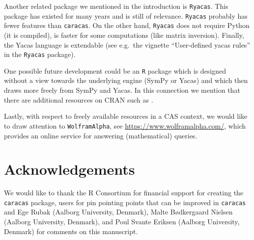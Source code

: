 Another related package we mentioned in the introduction is \texttt{Ryacas}.
This package has existed for many years and is still of relevance.
\texttt{Ryacas} probably has fewer features than \texttt{caracas}. On the other
hand, \texttt{Ryacas} does not require Python (it is compiled), is faster for
some computations (like matrix inversion). Finally, the Yacas language
\citep{Pinkus2002, yacas} is extendable (see e.g.~the vignette
``User-defined yacas rules'' in the \texttt{Ryacas} package).

One possible future development could be an \texttt{R} package which is
designed without a view towards the underlying engine (SymPy or Yacas)
and which then draws more freely from SymPy and Yacas.
In this connection we mention that there are additional resources
on CRAN such as  \citep{JSSv104i05}.

Lastly, with respect to freely available resources in a CAS context, we would
like to draw attention to \texttt{WolframAlpha}, see
\url{https://www.wolframalpha.com/}, which provides an online service for
answering (mathematical) queries.

\hypertarget{acknowledgements}{%
\section{Acknowledgements}\label{acknowledgements}}

We would like to thank the R Consortium for financial support for
creating the \texttt{caracas} package, users for pin pointing points
that can be improved in \texttt{caracas} and Ege Rubak (Aalborg
University, Denmark), Malte Bødkergaard Nielsen (Aalborg
University, Denmark), and Poul Svante Eriksen (Aalborg
University, Denmark)
for comments on this manuscript.




